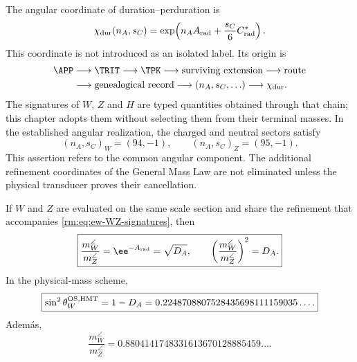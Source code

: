 The angular coordinate of duration--perduration is
\begin{equation}
\label{rm:eq:ew-angular-character}
\chi_{\rm dur}(n_A,s_C)
=\exp\!\left(n_AA_{\rm rad}
+\frac{s_C}{6}C^*_{\rm rad}\right).
\end{equation}
This coordinate is not introduced as an isolated label. Its origin is
\begin{equation}
\label{rm:eq:ew-signature-provenance}
\begin{aligned}
\APP&\longrightarrow\TRIT\longrightarrow\TPK
\longrightarrow\text{surviving extension}
\longrightarrow\text{route}\\
&\longrightarrow\text{genealogical record}
\longrightarrow(n_A,s_C,\ldots)
\longrightarrow\chi_{\rm dur}.
\end{aligned}
\end{equation}
The signatures of \(W\), \(Z\) and \(H\) are typed quantities obtained through
that chain; this chapter adopts them without selecting them from
their terminal masses. In the established angular realization, the
charged and neutral sectors satisfy
\begin{equation}
\label{rm:eq:ew-WZ-signatures}
(n_A,s_C)_W=(94,-1),
\qquad
(n_A,s_C)_Z=(95,-1).
\end{equation}
This assertion refers to the common angular component. The
additional refinement coordinates of the General Mass Law are not
eliminated unless the physical transducer proves their cancellation.

\begin{theorem}
\label{rm:thm:ew-weinberg}
If \(W\) and \(Z\) are evaluated on the same scale section and share
the refinement that accompanies \cref{rm:eq:ew-WZ-signatures}, then
\begin{equation}
\label{rm:eq:ew-WZ-ratio}
\boxed{
\frac{m_W^{\angle}}{m_Z^{\angle}}
=\ee^{-A_{\rm rad}}=\sqrt{D_A},
\qquad
\left(\frac{m_W^{\angle}}{m_Z^{\angle}}\right)^2=D_A.}
\end{equation}
In the physical-mass scheme,
\begin{equation}
\label{rm:eq:ew-sin2thetaW}
\boxed{
\sin^2\theta_W^{\rm OS,HMT}=1-D_A
=0.2248708807528435698111159035\ldots .}
\end{equation}
Adem\'as,
\begin{equation}
\label{rm:eq:ew-WZ-terminal-ratio}
\frac{m_W^{\angle}}{m_Z^{\angle}}
=0.8804141748331613670128885459\ldots .
\end{equation}
\end{theorem}

